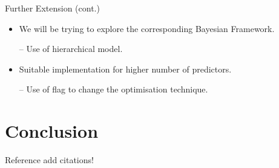 \documentclass[tikz]{beamer}					%
\begin{document}
{
\begin{frame}{Further Extension (cont.)}
\begin{itemize}
    \item We will be trying to explore the corresponding Bayesian Framework.
    
    -- Use of hierarchical model.
    \item Suitable implementation for higher number of predictors.
    
    -- Use of flag to change the optimisation technique.
\end{itemize}
\end{frame}
}


\section{Conclusion}


{
\begin{frame}{Reference}
\centering
add citations!
\end{frame}
}
\end{document}

